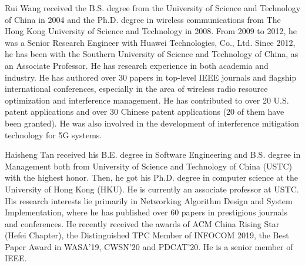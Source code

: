 \begin{IEEEbiography}{Rui Wang}
    received the B.S. degree from the University of Science and Technology of China in 2004 and the Ph.D. degree in wireless communications from The Hong Kong University of Science and Technology in 2008.
    From 2009 to 2012, he was a Senior Research Engineer with Huawei Technologies, Co., Ltd. Since 2012, he has been with the Southern University of Science and Technology of China, as an Associate Professor. He has research experience in both academia and industry. He has authored over 30 papers in top-level IEEE journals and flagship international conferences, especially in the area of wireless radio resource optimization and interference management. He has contributed to over 20 U.S. patent applications and over 30 Chinese patent applications (20 of them have been granted). He was also involved in the development of interference mitigation technology for 5G systems.
\end{IEEEbiography}
\vspace{-1cm}

\begin{IEEEbiography}{Haisheng Tan}
    received his B.E. degree in Software Engineering and B.S. degree in Management both from University of Science and Technology of China (USTC) with the highest honor. Then, he got his Ph.D. degree in computer science at the University of Hong Kong (HKU). He is currently an associate professor at USTC. His research interests lie primarily in Networking Algorithm Design and System Implementation, where he has published over 60 papers in prestigious journals and conferences. He recently received the awards of ACM China Rising Star (Hefei Chapter), the Distinguished TPC Member of INFOCOM 2019, the Best Paper Award in WASA'19, CWSN'20 and PDCAT'20. He is a senior member of IEEE.
\end{IEEEbiography}
\vspace{-1cm}

